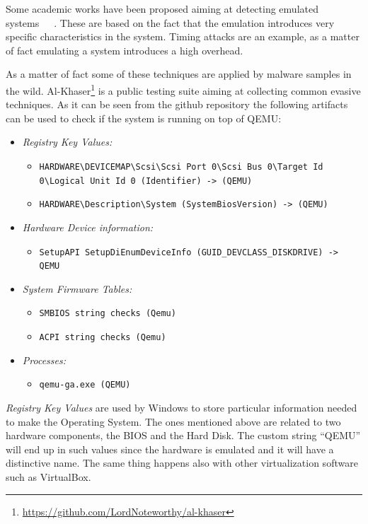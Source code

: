 Some academic works have been proposed aiming at detecting emulated systems~\cite{hwemu}~\cite{10.1145/1572272.1572303}~\cite{184461}. These are based on the fact that the emulation introduces very specific characteristics in the system. Timing attacks are an example, as a matter of fact emulating a system introduces a high overhead. 

As a matter of fact some of these techniques are applied by malware samples in the wild. Al-Khaser\footnote{\url{https://github.com/LordNoteworthy/al-khaser}} is a public testing suite aiming at collecting common evasive techniques. As it can be seen from the github repository the following artifacts can be used to check if the system is running on top of QEMU:

\begin{itemize}
    \item \textit{Registry Key Values:}
    \begin{itemize}
        \item \lstinline{HARDWARE\DEVICEMAP\Scsi\Scsi Port 0\Scsi Bus 0\Target Id 0\Logical Unit Id 0 (Identifier) -> (QEMU)}
    \item \lstinline{HARDWARE\Description\System (SystemBiosVersion) -> (QEMU)} 
    \end{itemize}
    
    \item \textit{Hardware Device information:}
    \begin{itemize}
        \item \lstinline{SetupAPI SetupDiEnumDeviceInfo (GUID_DEVCLASS_DISKDRIVE) -> QEMU} 
    \end{itemize}
    
    \item \textit{System Firmware Tables:}
    \begin{itemize}
        \item \lstinline{SMBIOS string checks (Qemu)}
        \item \lstinline{ACPI string checks (Qemu)}
    \end{itemize}
    
    \item \textit{Processes:}
    \begin{itemize}
        \item \lstinline{qemu-ga.exe (QEMU)}
    \end{itemize}
\end{itemize}

\textit{Registry Key Values} are used by Windows to store particular information needed to make the Operating System. The ones mentioned above are related to two hardware components, the BIOS and the Hard Disk. The custom string ``QEMU'' will end up in such values since the hardware is emulated and it will have a distinctive name. The same thing happens also with other virtualization software such as VirtualBox.

